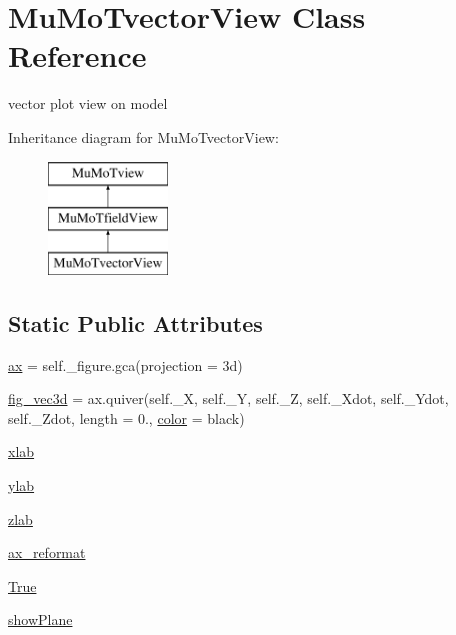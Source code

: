 \hypertarget{class_mu_mo_t_1_1_mu_mo_tvector_view}{}\section{Mu\+Mo\+Tvector\+View Class Reference}
\label{class_mu_mo_t_1_1_mu_mo_tvector_view}


vector plot view on model  


Inheritance diagram for Mu\+Mo\+Tvector\+View\+:\begin{figure}[H]
\begin{center}
\leavevmode
\includegraphics[height=3.000000cm]{class_mu_mo_t_1_1_mu_mo_tvector_view}
\end{center}
\end{figure}
\subsection*{Static Public Attributes}
\begin{DoxyCompactItemize}
\item 
\hyperlink{class_mu_mo_t_1_1_mu_mo_tvector_view_a8fa675eb2fcec5b95d9d21c670da7f30}{ax} = self.\+\_\+figure.\+gca(projection = \textquotesingle{}3d\textquotesingle{})
\item 
\hyperlink{class_mu_mo_t_1_1_mu_mo_tvector_view_a0d21a210e4f523569e4c57a12f80040c}{fig\+\_\+vec3d} = ax.\+quiver(self.\+\_\+X, self.\+\_\+Y, self.\+\_\+Z, self.\+\_\+\+Xdot, self.\+\_\+\+Ydot, self.\+\_\+\+Zdot, length = 0., \hyperlink{class_mu_mo_t_1_1_mu_mo_tview_a37dbdc30935031c05304482e1be89d8f}{color} = \textquotesingle{}black\textquotesingle{})
\item 
\hyperlink{class_mu_mo_t_1_1_mu_mo_tvector_view_abb76a7390100209788848dbd6bb9fe30}{xlab}
\item 
\hyperlink{class_mu_mo_t_1_1_mu_mo_tvector_view_a83433d4e45c13afe9a0042ae113ad169}{ylab}
\item 
\hyperlink{class_mu_mo_t_1_1_mu_mo_tvector_view_a180fbd5bd60d175c88a69e1dd3b0ed77}{zlab}
\item 
\hyperlink{class_mu_mo_t_1_1_mu_mo_tvector_view_a73c8f7f0d9593ed55a0cb1bea896b9f4}{ax\+\_\+reformat}
\item 
\hyperlink{class_mu_mo_t_1_1_mu_mo_tvector_view_a643a20c0c59588a0f741a6095e2025fd}{True}
\item 
\hyperlink{class_mu_mo_t_1_1_mu_mo_tvector_view_a44c38482b3d22d05f8bbadb81ec2d40a}{show\+Plane}
\end{DoxyCompactItemize}
